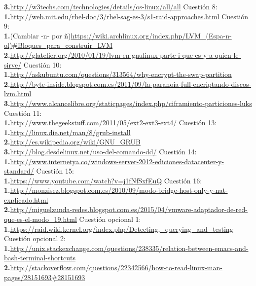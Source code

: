 \documentclass[a4paper, 11pt]{article} %
\begin{document}
\begin{thebibliography}{X}
	\textbf{3.}\url{http://w3techs.com/technologies/details/os-linux/all/all}
 Cuestión 8:\\
	\textbf{1.}\url{http://web.mit.edu/rhel-doc/3/rhel-sag-es-3/s1-raid-approaches.html}
 Cuestión 9:\\
	\textbf{1.}(Cambiar -n- por ñ)\url{https://wiki.archlinux.org/index.php/LVM_(Espa-n-ol)#Bloques_para_construir_LVM}\\
	\textbf{2.}\url{http://glatelier.org/2010/01/19/lvm-en-gnulinux-parte-i-que-es-y-a-quien-le-sirve/}
 Cuestión 10:\\
	\textbf{1.}\url{http://askubuntu.com/questions/313564/why-encrypt-the-swap-partition}\\
	\textbf{2.}\url{http://byte-inside.blogspot.com.es/2011/09/la-paranoia-full-encriptando-discos-lvm.html}\\
	\textbf{3.}\url{http://www.alcancelibre.org/staticpages/index.php/ciframiento-particiones-luks}
 Cuestión 11:\\
	\textbf{1.}\url{http://www.thegeekstuff.com/2011/05/ext2-ext3-ext4/}
 Cuestión 13:\\
	\textbf{1.}\url{http://linux.die.net/man/8/grub-install}\\
	\textbf{2.}\url{http://es.wikipedia.org/wiki/GNU_GRUB}\\
	\textbf{3.}\url{http://blog.desdelinux.net/uso-del-comando-dd/}
 Cuestión 14:\\
	\textbf{1.}\url{http://www.internetya.co/windows-server-2012-ediciones-datacenter-y-standard/}
 Cuestión 15:\\
	\textbf{1.}\url{https://www.youtube.com/watch?v=j1fNfSxfEuQ}
 Cuestión 16:\\
	\textbf{1.}\url{http://monzisez.blogspot.com.es/2010/09/modo-bridge-host-only-y-nat-explicado.html}\\
	\textbf{2.}\url{http://miguelzunda-redes.blogspot.com.es/2015/04/vmware-adaptador-de-red-que-es-el-modo_19.html}
 Cuestión opcional 1:\\
	\textbf{1.}\url{https://raid.wiki.kernel.org/index.php/Detecting,_querying_and_testing}
 Cuestión opcional 2:\\
	\textbf{1.}\url{http://unix.stackexchange.com/questions/238335/relation-between-emacs-and-bash-terminal-shortcuts}\\
	\textbf{2.}\url{http://stackoverflow.com/questions/22342566/how-to-read-linux-man-pages/28151693#28151693}
\end{thebibliography}
\end{document}
